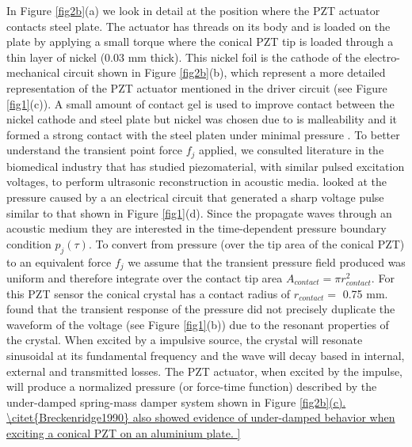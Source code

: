 \documentclass[preprint,3p, 11pt,authoryear]{elsarticle}
\begin{document}
In Figure \ref{fig2b}(a) we look in detail at the position where the PZT actuator contacts steel plate. The actuator has threads on its body and is loaded on the plate by applying a small torque where the conical PZT tip is loaded through a thin layer of nickel (0.03 mm thick). This nickel foil is the cathode of the electro-mechanical circuit shown in Figure \ref{fig2b}(b), which represent a more detailed representation of the PZT actuator mentioned in the driver circuit (see Figure \ref{fig1}(c)). A small amount of contact gel is used to improve contact between the nickel cathode and steel plate but nickel was chosen due to is malleability and it formed a strong contact with the steel platen under minimal pressure \citep{Glaser1998}. To better understand the transient point force $f_{j}$ applied, we consulted literature in the biomedical industry that has studied piezomaterial, with similar pulsed excitation voltages, to perform ultrasonic reconstruction in acoustic media.  \citet{Christensen1988} looked at the pressure caused by a an electrical circuit that generated a sharp voltage pulse similar to that shown in Figure \ref{fig1}(d). Since the propagate waves through an acoustic medium they are interested in the time-dependent pressure boundary condition $p_{j}(\tau)$. To convert from pressure (over the tip area of the conical PZT) to an equivalent force $f_{j}$ we assume that the transient pressure field produced was uniform and therefore integrate over the contact tip area $A_{contact} = \pi r_{contact}^{2}$. For this PZT sensor the conical crystal has a contact radius of $r_{contact} = $ 0.75 mm. \cite{Christensen1988} found that the transient response of the pressure did not precisely duplicate the waveform of the voltage (see Figure \ref{fig1}(b)) due to the resonant properties of the crystal. When excited by a impulsive source, the crystal will resonate sinusoidal at its fundamental frequency and the wave will decay based in internal, external and transmitted losses.  The PZT actuator, when excited by the impulse, will produce a normalized pressure (or force-time function) described by the under-damped spring-mass damper system shown in Figure \ref{fig2b](c). \citet{Breckenridge1990} also showed evidence of under-damped behavior when exciting a conical PZT on an aluminium plate.

}
\end{document}
